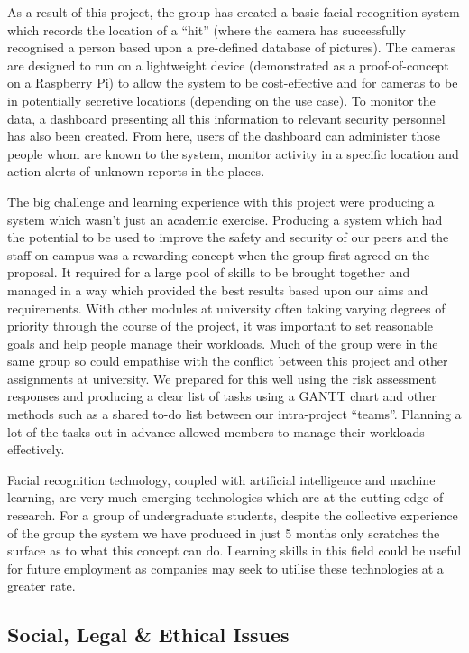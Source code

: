 \documentclass[
  english,
  a4paper,
,tablecaptionabove
]{scrartcl}
\begin{document}
As a result of this project, the group has created a basic facial
recognition system which records the location of a \enquote{hit} (where
the camera has successfully recognised a person based upon a pre-defined
database of pictures). The cameras are designed to run on a lightweight
device (demonstrated as a proof-of-concept on a Raspberry Pi) to allow
the system to be cost-effective and for cameras to be in potentially
secretive locations (depending on the use case). To monitor the data, a
dashboard presenting all this information to relevant security personnel
has also been created. From here, users of the dashboard can administer
those people whom are known to the system, monitor activity in a
specific location and action alerts of unknown reports in the places.

The big challenge and learning experience with this project were
producing a system which wasn't just an academic exercise. Producing a
system which had the potential to be used to improve the safety and
security of our peers and the staff on campus was a rewarding concept
when the group first agreed on the proposal. It required for a large
pool of skills to be brought together and managed in a way which
provided the best results based upon our aims and requirements. With
other modules at university often taking varying degrees of priority
through the course of the project, it was important to set reasonable
goals and help people manage their workloads. Much of the group were in
the same group so could empathise with the conflict between this project
and other assignments at university. We prepared for this well using the
risk assessment responses and producing a clear list of tasks using a
GANTT chart and other methods such as a shared to-do list between our
intra-project \enquote{teams}. Planning a lot of the tasks out in
advance allowed members to manage their workloads effectively.

Facial recognition technology, coupled with artificial intelligence and
machine learning, are very much emerging technologies which are at the
cutting edge of research. For a group of undergraduate students, despite
the collective experience of the group the system we have produced in
just 5 months only scratches the surface as to what this concept can do.
Learning skills in this field could be useful for future employment as
companies may seek to utilise these technologies at a greater rate.

\hypertarget{social-legal-ethical-issues}{%
\subsection{Social, Legal \& Ethical
Issues}\label{social-legal-ethical-issues}}
\end{document}
